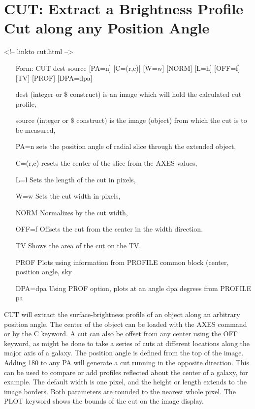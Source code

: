 
\section{CUT: Extract a Brightness Profile Cut along any Position Angle}
\begin{rawhtml}
<!-- linkto cut.html -->
\end{rawhtml}

\begin{itemize}
  \item[Form: CUT dest source {[PA=n]} {[C=(r,c)]} {[W=w]} {[NORM]} {[L=h]}
       {[OFF=f]} {[TV]} {[PROF]} {[DPA=dpa]} \hfill]{}
  \item[dest]{(integer or \$ construct) is an image which
       will hold the calculated cut profile,}
  \item[source]{(integer or \$ construct) is the image (object)
       from which the cut is to be measured,}
  \item[PA=n]{sets the position angle of radial slice through the 
       extended object,}
  \item[C=(r,c)]{resets the center of the slice from the AXES values,}
  \item[L=l]{Sets the length of the cut in pixels,}
  \item[W=w]{Sets the cut width in pixels,}
  \item[NORM]{Normalizes by the cut width,}
  \item[OFF=f]{Offsets the cut from the center in the width direction.}
  \item[TV]{Shows the area of the cut on the TV.}
  \item[PROF]{Plots using information from PROFILE common block (center, 
        position angle, sky}
  \item[DPA=dpa]{Using PROF option, plots at an angle dpa degrees from
        PROFILE pa}
\end{itemize}
 
CUT will extract the surface-brightness profile of an object along an
arbitrary position angle.  The center of the object can be loaded with the
AXES command or by the C keyword.  A cut can also be offset from any center
using the OFF keyword, as might be done to take a series of cuts at
different locations along the major axis of a galaxy.  The position angle
is defined from the top of the image.  Adding 180 to any PA will generate a
cut running in the opposite direction.  This can be used to compare or add
profiles reflected about the center of a galaxy, for example.  The default
width is one pixel, and the height or length extends to the image borders.
Both parameters are rounded to the nearest whole pixel. The PLOT keyword
shows the bounds of the cut on the image display.


